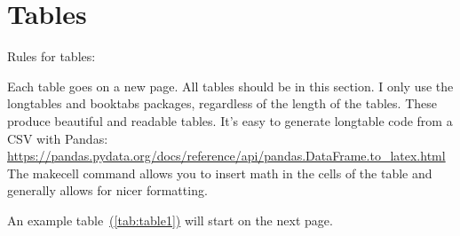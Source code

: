 \documentclass{getwriting}
\begin{document}
\section{Tables}
Rules for tables:
\begin{outline}
\1 Each table goes on a new page. All tables should be in this section.
\1 I only use the longtables and booktabs packages, regardless of the length of the tables. These produce beautiful and readable tables. It's easy to generate longtable code from a CSV with Pandas: \url{https://pandas.pydata.org/docs/reference/api/pandas.DataFrame.to_latex.html}
\1 The makecell command allows you to insert math in the cells of the table and generally allows for nicer formatting.
\end{outline}
\par
An example table~\hyperref[tab:table1]{(\autoref{tab:table1})} will start on the next page.
\newpage
\end{document}
